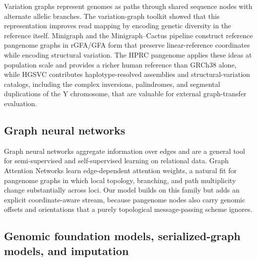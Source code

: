 \IfFileExists{ws-procs11x85.cls}{\worldscientificclasstrue\documentclass{ws-procs11x85}}{\worldscientificclassfalse\documentclass[11pt]{article}\usepackage[margin=1in]{geometry}}
\begin{document}
Variation graphs represent genomes as paths through shared sequence nodes with
alternate allelic branches. The variation-graph toolkit showed that this
representation improves read mapping by encoding genetic diversity in the
reference itself.\cite{garrison2018vg} Minigraph and the Minigraph--Cactus
pipeline construct reference pangenome graphs in rGFA/GFA form that preserve
linear-reference coordinates while encoding structural
variation.\cite{li2020minigraph,hickey2024minigraphcactus} The HPRC pangenome
applies these ideas at population scale and provides a richer human reference
than GRCh38 alone,\cite{liao2023hprc} while HGSVC contributes
haplotype-resolved assemblies and structural-variation catalogs, including the
complex inversions, palindromes, and segmental duplications of the Y
chromosome, that are valuable for external graph-transfer
evaluation.\cite{ebert2021hgsvc,hallast2023ychrom}

\subsection{Graph neural networks}

Graph neural networks aggregate information over edges and are a general tool
for semi-supervised and self-supervised learning on relational
data.\cite{kipf2017gcn,velickovic2018gat} Graph Attention Networks learn
edge-dependent attention weights, a natural fit for pangenome graphs in which
local topology, branching, and path multiplicity change substantially across
loci.\cite{velickovic2018gat} Our model builds on this family but adds an
explicit coordinate-aware stream, because pangenome nodes also carry genomic
offsets and orientations that a purely topological message-passing scheme
ignores.

\subsection{Genomic foundation models, serialized-graph models, and imputation}
\end{document}
